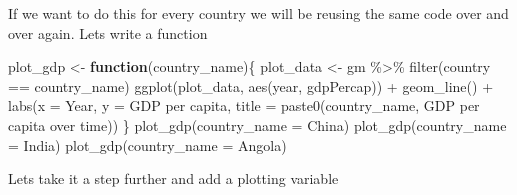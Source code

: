 \documentclass[
]{book}
\newenvironment{Shaded}{\begin{snugshade}}{\end{snugshade}}
\newcommand{\AttributeTok}[1]{\textcolor[rgb]{0.77,0.63,0.00}{#1}}
\newcommand{\ControlFlowTok}[1]{\textcolor[rgb]{0.13,0.29,0.53}{\textbf{#1}}}
\newcommand{\FunctionTok}[1]{\textcolor[rgb]{0.00,0.00,0.00}{#1}}
\newcommand{\NormalTok}[1]{#1}
\newcommand{\OtherTok}[1]{\textcolor[rgb]{0.56,0.35,0.01}{#1}}
\newcommand{\SpecialCharTok}[1]{\textcolor[rgb]{0.00,0.00,0.00}{#1}}
\newcommand{\StringTok}[1]{\textcolor[rgb]{0.31,0.60,0.02}{#1}}
\begin{document}
If we want to do this for every country we will be reusing the same code over and over again. Lets write a function

\begin{Shaded}
\begin{Highlighting}[]
\NormalTok{plot\_gdp }\OtherTok{\textless{}{-}} \ControlFlowTok{function}\NormalTok{(country\_name)\{}
\NormalTok{  plot\_data }\OtherTok{\textless{}{-}}\NormalTok{ gm }\SpecialCharTok{\%\textgreater{}\%} \FunctionTok{filter}\NormalTok{(country }\SpecialCharTok{==}\NormalTok{ country\_name) }
  \FunctionTok{ggplot}\NormalTok{(plot\_data, }\FunctionTok{aes}\NormalTok{(year, gdpPercap)) }\SpecialCharTok{+} 
    \FunctionTok{geom\_line}\NormalTok{() }\SpecialCharTok{+}
    \FunctionTok{labs}\NormalTok{(}\AttributeTok{x =} \StringTok{\textquotesingle{}Year\textquotesingle{}}\NormalTok{, }\AttributeTok{y =} \StringTok{\textquotesingle{}GDP per capita\textquotesingle{}}\NormalTok{, }\AttributeTok{title =} \FunctionTok{paste0}\NormalTok{(country\_name, }\StringTok{\textquotesingle{} GDP per capita over time\textquotesingle{}}\NormalTok{))}
\NormalTok{\}}
\FunctionTok{plot\_gdp}\NormalTok{(}\AttributeTok{country\_name =} \StringTok{\textquotesingle{}China\textquotesingle{}}\NormalTok{)}
\FunctionTok{plot\_gdp}\NormalTok{(}\AttributeTok{country\_name =} \StringTok{\textquotesingle{}India\textquotesingle{}}\NormalTok{)}
\FunctionTok{plot\_gdp}\NormalTok{(}\AttributeTok{country\_name =} \StringTok{\textquotesingle{}Angola\textquotesingle{}}\NormalTok{)}
\end{Highlighting}
\end{Shaded}

Lets take it a step further and add a plotting variable
\end{document}
